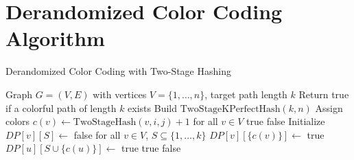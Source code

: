 \documentclass{article}
\begin{document}



\section{Derandomized Color Coding Algorithm}
\begin{algorithm}[H]
    \caption{Derandomized Color Coding with Two-Stage Hashing}
    \begin{algorithmic}[1]
        \Require Graph $G = (V, E)$ with vertices $V = \{1, \dots, n\}$, target path length $k$
        \Ensure Return true if a colorful path of length $k$ exists
        \State Build $\text{TwoStageKPerfectHash}(k, n)$
        \State Assign colors $c(v) \gets \text{TwoStageHash}(v, i, j) + 1$ for all $v \in V$
        \State \Return true
        \EndIf
        \EndFor
        \EndFor
        \State \Return false
        \State Initialize $DP[v][S] \gets$ false for all $v \in V$, $S \subseteq \{1,\ldots,k\}$
        \State $DP[v][\{c(v)\}] \gets$ true
        \EndFor
        \State $DP[u][S \cup \{c(u)\}] \gets$ true
        \EndFor
        \EndFor
        \EndFor
        \EndFor
        \State \Return true
        \EndIf
        \EndFor
        \State \Return false
        \EndFunction
    \end{algorithmic}
\end{algorithm}
\end{document}

